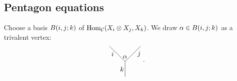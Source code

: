 \documentclass{amsart}
\begin{document}
\subsection{Pentagon equations} \label{sec:PE}
Choose a basis $B(i,j;k)$ of $\mathrm{Hom}_{\mathcal{C}}(X_i\otimes X_j,X_k)$. We draw $\alpha\in B(i,j;k)$ as a trivalent vertex:
\begin{equation}\label{Fig: alpha}
\raisebox{-.8cm}{
\begin{tikzpicture}
\begin{scope}[scale=.8]
\draw (0,2)--(.5,1.5);
\draw (1,1)--(.5,1.5);
\draw (2,2)--(1.5,1.5);
\draw (1,1)--(1.5,1.5);
\draw (1,1)--(1,.5);
\draw (1,0)--(1,.5);
\node at (1,1.3) {$\alpha$};
\node at (.2,1.5) {${i}$};
\node at (1.9,1.5) {${j}$};
\node at (.8,.5) {${k}$};
\end{scope}
\end{tikzpicture}}.
\end{equation}
\end{document}
